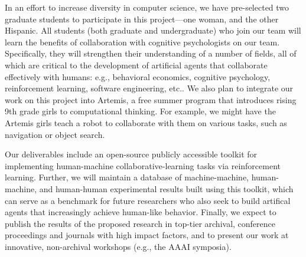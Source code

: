 
In an effort to increase diversity in computer science, we have
pre-selected two graduate students to participate in this
project---one woman, and the other Hispanic.  All students (both
graduate and undergraduate) who join our team will learn the benefits
of collaboration with cognitive psychologists on our team.  Specifically, they will
strengthen their understanding of a number of fields, all of which are
critical to the development of artificial agents that collaborate
effectively with humans: e.g., behavioral economics, cognitive
psychology, reinforcement learning, software engineering, etc..
%
We also plan to integrate our work on this project into Artemis, a
free summer program that introduces rising 9th grade girls to
computational thinking.
For example, we might have the Artemis girls teach a robot to
collaborate with them on various tasks, such as navigation or object search.

Our deliverables include an open-source publicly accessible toolkit
for implementing human-machine collaborative-learning tasks via
reinforcement learning. Further, we will maintain a database of
machine-machine, human-machine, and human-human experimental results
built using this toolkit, which can serve as a benchmark for future
researchers who also seek to build artifical agents that increasingly
achieve human-like behavior.
%
Finally, we expect to publish the results of the proposed research in
top-tier archival, conference proceedings and journals with high
impact factors, and to present our work at innovative, non-archival
workshops (e.g., the AAAI symposia).

